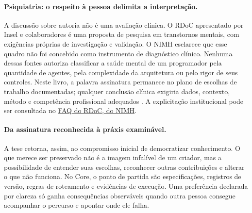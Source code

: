 \paragraph{Psiquiatria: o respeito à pessoa delimita a interpretação.}
A discussão sobre autoria não é uma avaliação clínica. O RDoC apresentado
por Insel e colaboradores é uma proposta de pesquisa em transtornos mentais,
com exigências próprias de investigação e validação. O NIMH esclarece que
esse quadro não foi concebido como instrumento de diagnóstico clínico.
Nenhuma dessas fontes autoriza classificar a saúde mental de um programador
pela quantidade de agentes, pela complexidade da arquitetura ou pelo rigor
de seus controles. Neste livro, a palavra assinatura permanece no plano de
escolhas de trabalho documentadas; qualquer conclusão clínica exigiria dados,
contexto, método e competência profissional adequados
.
A explicitação institucional pode ser consultada no
\href{https://www.nimh.nih.gov/research/research-funded-by-nimh/rdoc/resources/rdoc-frequently-asked-questions-faq}{FAQ do RDoC, do NIMH}.

\paragraph{Da assinatura reconhecida à práxis examinável.}
A tese retorna, assim, ao compromisso inicial de democratizar conhecimento.
O que merece ser preservado não é a imagem infalível de um criador, mas a
possibilidade de entender suas escolhas, reconhecer outras contribuições e
alterar o que não funciona. No Core, o ponto de partida são especificações,
registros de versão, regras de roteamento e evidências de execução. Uma
preferência declarada por clareza só ganha consequências observáveis quando
outra pessoa consegue acompanhar o percurso e apontar onde ele falha.


